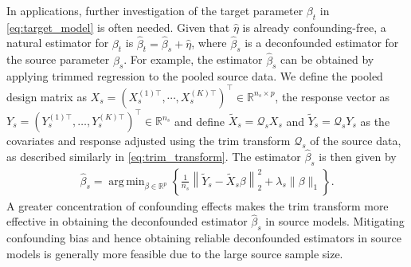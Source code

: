 \documentclass[12pt]{article}
\DeclareMathOperator*{\argmin}{arg\,min}
\begin{document}
In applications, further investigation of the target parameter $\beta_t$ in \eqref{eq:target_model} is often needed. Given that $\hat{\eta}$ is already confounding-free, a natural estimator for $\beta_t$ is $\hat{\beta}_t = \hat{\beta}_s +\hat{\eta}$, where $\hat{\beta}_s$ is a deconfounded estimator for the source parameter $\beta_s$. For example, the estimator $\hat{\beta}_s$ can be obtained by applying trimmed regression to the pooled source data. We define the pooled  design matrix as $X_s = (X_s^{(1)\top}, \cdots, X_s^{(K)\top})^\top \in \mathbb{R}^{n_s \times p}$, the response vector as $Y_s = (Y_s^{(1)\top}, \ldots, Y_s^{(K)\top})^\top \in \mathbb{R}^{n_s}$ and define $\tilde{X}_s = \mathcal{Q}_s X_s$ and $\tilde{Y}_s = \mathcal{Q}_s Y_s$ as the covariates and response adjusted using the trim transform $\mathcal{Q}_s$ of the source data, as described similarly in \eqref{eq:trim_transform}. The estimator $\hat{\beta}_s$ is then given by
\begin{align}
\label{eq:estimator_betas}
    \hat{\beta}_s = \argmin_{\beta \in \mathbb{R}^p} \left\{\frac{1}{n_s}  \left\|\tilde{Y}_s - \tilde{X}_s \beta\right\|_2^2 +\lambda_s\|\beta\|_1 \right\}.
\end{align}
A greater concentration of confounding effects makes the trim transform more effective in obtaining the deconfounded estimator $\hat{\beta}_s$ in source models. 
Mitigating confounding bias and hence obtaining reliable deconfounded estimators in source models is generally more feasible due to the large source sample size.
\end{document}
